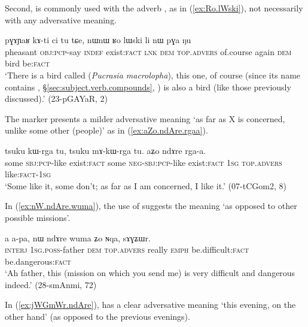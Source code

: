Second,  is commonly used with the adverb , as in (\ref{ex:Ro.lWski}), not necessarily with any adversative meaning.

\begin{exe}
\ex \label{ex:Ro.lWski}
\gll  pɣɤɲaʁ kɤ-ti ci tu tɕe, nɯnɯ ʁo lɯski li nɯ pɣa ŋu \\
pheasant \textsc{obj}:\textsc{pcp}-say \textsc{indef} exist:\textsc{fact} \textsc{lnk} \textsc{dem} \textsc{top}.\textsc{advers} of.course again \textsc{dem} bird be:\textsc{fact} \\
\glt `There is a bird called  (\textit{Pucrasia macrolopha}), this one, of course (since its name contains , §\ref{sec:subject.verb.compounds}, ) is also a bird (like those previously discussed).' (23-pGAYaR, 2)
\end{exe}

The marker  presents a milder adversative meaning `as far as X is concerned, unlike some other (people)' as in (\ref{ex:aZo.ndAre.rgaa}).  

\begin{exe}
\ex \label{ex:aZo.ndAre.rgaa}
\gll tsuku kɯ-rga tu, tsuku mɤ-kɯ-rga tu. aʑo ndɤre rga-a. \\
some \textsc{sbj}:\textsc{pcp}-like exist:\textsc{fact} some \textsc{neg}-\textsc{sbj}:\textsc{pcp}-like exist:\textsc{fact} \textsc{1sg} \textsc{top}.\textsc{advers} like:\textsc{fact}-\textsc{1sg} \\
\glt `Some like it, some don't; as far as I am concerned, I like it.' (07-tCGom2, 8)
\end{exe}

In (\ref{ex:nW.ndAre.wuma}), the use of  suggests the meaning `as opposed to other possible missions'.

\begin{exe}
\ex \label{ex:nW.ndAre.wuma}
\gll a a-pa, nɯ ndɤre wuma ʑo ɴqa, sɤɣʑɯr. \\
\textsc{interj} \textsc{1sg}.\textsc{poss}-father \textsc{dem} \textsc{top}.\textsc{advers} really \textsc{emph} be.difficult:\textsc{fact} be.dangerous:\textsc{fact} \\
\glt `Ah father, this (mission on which you send me) is very difficult and dangerous indeed.' (28-smAnmi, 72)
\end{exe}

In (\ref{ex:jWGmWr.ndAre}),  has a clear adversative meaning `this evening, on the other hand' (as opposed to the previous evenings).

